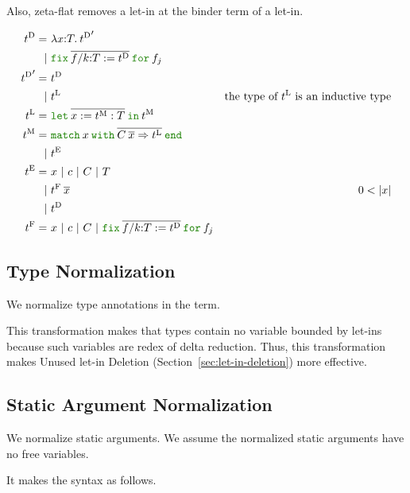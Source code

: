 \documentclass[a4paper,fleqn]{article}
\newcommand{\kwlet}{\mbox{\color{mygreen}\ttfamily let}}
\newcommand{\kwin}{\mbox{\color{mygreen}\ttfamily in}}
\newcommand{\kwmatch}{\mbox{\color{mygreen}\ttfamily match}}
\newcommand{\kwwith}{\mbox{\color{mygreen}\ttfamily with}}
\newcommand{\kwend}{\mbox{\color{mygreen}\ttfamily end}}
\newcommand{\kwfix}{\mbox{\color{mygreen}\ttfamily fix}}
\newcommand{\kwfor}{\mbox{\color{mygreen}\ttfamily for}}
\newcommand{\lamT}[3]{\lambda #1\mathord{:}#2.\:#3}
\newcommand{\letinM}[3]{\kwlet\:\rep{#1:=#2}\:\kwin\:#3}
\newcommand{\omatch}[2]{\kwmatch\:#1\:\kwwith\:{#2}\:\kwend}
\newcommand{\ofix}[2]{\kwfix\:{#1}\:\kwfor\:{#2}}
\newcommand{\tD}{{t^\mathrm{D}}}
\newcommand{\tE}{{t^\mathrm{E}}}
\newcommand{\tL}{{t^\mathrm{L}}}
\newcommand{\tM}{{t^\mathrm{M}}}
\newcommand{\tF}{{t^\mathrm{F}}}
\newcommand{\secref}[1]{Section~\ref{#1}}
\newcommand{\rep}[1]{\overline{#1}}
\begin{document}
Also, zeta-flat removes a let-in at the binder term of a let-in.

\begin{align*}
  \tD =&\ \lamT{x}{T}{\tD'} \\
      |&\ \ofix{\overline{f/k{:}T:=\tD}}{f_j} \\
  \tD' =&\ \tD \\
       |&\ \tL & \text{the type of $\tL$ is an inductive type} \\
  \tL =&\ \letinM{x}{\tM:T}{\tM} \\
  \tM =&\ \omatch{x}{\overline{C\:\overline{x}\Rightarrow \tL}} \\
      |&\ \tE \\
  \tE =&\ x ~|~ c ~|~ C ~|~ T \\
    |&\ \tF\:\rep{x} & \text{$0 < |x|$} \\
    |&\ \tD \\
  \tF =&\ x ~|~ c ~|~ C ~|~ \ofix{\overline{f/k{:}T:=\tD}}{f_j}
\end{align*}

\subsection{Type Normalization}\label{sec:type-normalization}

We normalize type annotations in the term.

This transformation makes that types contain no variable bounded by let-ins
because such variables are redex of delta reduction.
Thus, this transformation makes Unused let-in Deletion (\secref{sec:let-in-deletion}) more effective.

\subsection{Static Argument Normalization}\label{sec:static-argument-normalization}

We normalize static arguments.
We assume the normalized static arguments have no free variables.

It makes the syntax as follows.
\end{document}
